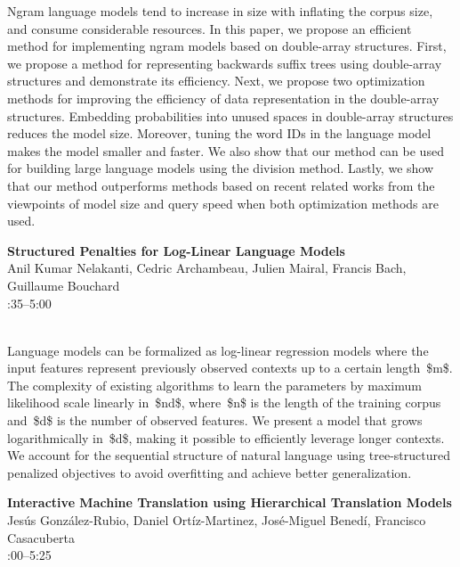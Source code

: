 \documentclass[twoside,makeidx]{book}
\renewcommand{\normalsize}{\fontsize{8}{9}\selectfont}
\renewcommand{\small}{\fontsize{7}{8}\selectfont}
\begin{document}
\nopagebreak%
\noindent%
{\small Ngram language models tend to increase in size with inflating the corpus size, and consume considerable resources. In this paper, we propose an efficient method for implementing ngram models based on double-array structures. First, we propose a method for representing backwards suffix trees using double-array structures and demonstrate its efficiency. Next, we propose two optimization methods for improving the efficiency of data representation in the double-array structures. Embedding probabilities into unused spaces in double-array structures reduces the model size. Moreover, tuning the word IDs in the language model makes the model smaller and faster. We also show that our method can be used for building large language models using the division method. Lastly, we show that our method outperforms methods based on recent related works from the viewpoints of model size and query speed when both optimization methods are used.}
\par\vspace{2em}\noindent%
\begin{minipage}{\linewidth}%
\begin{center}
\textbf{\normalsize Structured Penalties for Log-Linear Language Models}\\
\normalsize  Anil Kumar Nelakanti,  Cedric Archambeau,  Julien Mairal,  Francis Bach,  Guillaume Bouchard\\
{\small 4:35--5:00}\\
\end{center}
\end{minipage}\\[0.5em]
\nopagebreak%
\noindent%
{\small Language models can be formalized as log-linear regression models where the input features represent previously observed contexts up to a certain length~\$m\$. The complexity of existing algorithms to learn the parameters by maximum likelihood scale linearly in~\$nd\$, where~\$n\$ is the length of the training corpus and~\$d\$ is the number of observed features. We present a model that grows logarithmically in~\$d\$, making it possible to efficiently leverage longer contexts. We account for the sequential structure of natural language using tree-structured penalized objectives to avoid overfitting and achieve better generalization.}
\par\vspace{2em}\noindent%
\begin{minipage}{\linewidth}%
\begin{center}
\textbf{\normalsize Interactive Machine Translation using Hierarchical Translation Models}\\
\normalsize  Jes\'{u}s Gonz\'{a}lez-Rubio,  Daniel Ort\'{i}z-Martinez,  Jos\'{e}-Miguel Bened\'{i},  Francisco Casacuberta\\
{\small 5:00--5:25}\\
\end{center}
\end{minipage}\\[0.5em]
\end{document}

